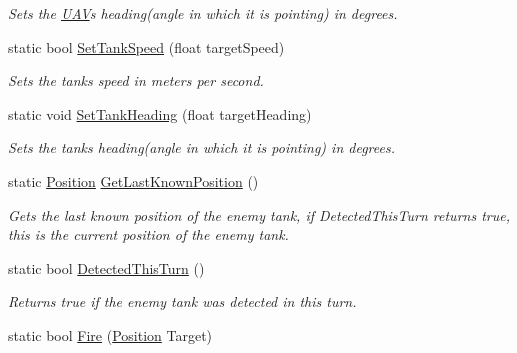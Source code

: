 \begin{DoxyCompactItemize}
\begin{DoxyCompactList}\small\item\em Sets the \hyperlink{class_n_g_a_p_i_1_1_u_a_v}{U\+AV}\textquotesingle{}s heading(angle in which it is pointing) in degrees. \end{DoxyCompactList}\item 
static bool \hyperlink{class_n_g_a_p_i_1_1_a_p_i_a44b396868d10d6182bca1b11fc1e0f65}{Set\+Tank\+Speed} (float target\+Speed)
\begin{DoxyCompactList}\small\item\em Sets the tank\textquotesingle{}s speed in meters per second. \end{DoxyCompactList}\item 
static void \hyperlink{class_n_g_a_p_i_1_1_a_p_i_a7bb4fcbbc23b3f95f372c7276c92386e}{Set\+Tank\+Heading} (float target\+Heading)
\begin{DoxyCompactList}\small\item\em Sets the tank\textquotesingle{}s heading(angle in which it is pointing) in degrees. \end{DoxyCompactList}\item 
\mbox{\label{class_n_g_a_p_i_1_1_a_p_i_adc594148535af505350268bbd5d45ddd}} 
static \hyperlink{struct_n_g_a_p_i_1_1_position}{Position} \hyperlink{class_n_g_a_p_i_1_1_a_p_i_adc594148535af505350268bbd5d45ddd}{Get\+Last\+Known\+Position} ()
\begin{DoxyCompactList}\small\item\em Gets the last known position of the enemy tank, if Detected\+This\+Turn returns true, this is the current position of the enemy tank. \end{DoxyCompactList}\item 
\mbox{\label{class_n_g_a_p_i_1_1_a_p_i_af73a1808cf1466afcf29262f78a2fa8c}} 
static bool \hyperlink{class_n_g_a_p_i_1_1_a_p_i_af73a1808cf1466afcf29262f78a2fa8c}{Detected\+This\+Turn} ()
\begin{DoxyCompactList}\small\item\em Returns true if the enemy tank was detected in this turn. \end{DoxyCompactList}\item 
\mbox{\label{class_n_g_a_p_i_1_1_a_p_i_adadc36796b61c7963e8bf9c16a81efb6}} 
static bool \hyperlink{class_n_g_a_p_i_1_1_a_p_i_adadc36796b61c7963e8bf9c16a81efb6}{Fire} (\hyperlink{struct_n_g_a_p_i_1_1_position}{Position} Target)

\end{DoxyCompactItemize}
